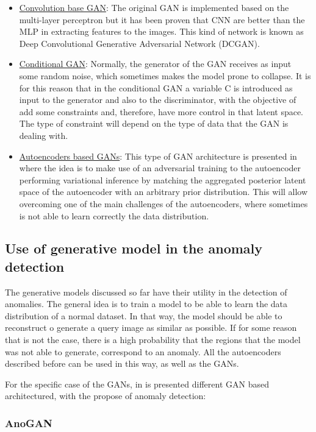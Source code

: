 \begin{itemize}
 \item \underline{Convolution base GAN}: The original GAN is implemented based on the multi-layer perceptron but it has been proven that CNN are better than the MLP in extracting features to the images. This kind of network is known as Deep Convolutional Generative Adversarial Network (DCGAN).
 \item \underline{Conditional GAN}: Normally, the generator of the GAN receives as input some random noise, which sometimes makes the model prone to collapse. It is for this reason that in the conditional GAN a variable C is introduced as input to the generator and also to the discriminator, with the objective of add some constraints and, therefore, have more control in that latent space. The type of constraint will depend on the type of data that the GAN is dealing with.
 \item \underline{Autoencoders based GANs}: This type of GAN architecture is presented in \cite{Makhzani2015} where the idea is to make use of an adversarial training to the autoencoder performing variational inference by matching the aggregated posterior latent space of the autoencoder with an arbitrary prior distribution. This will allow overcoming one of the main challenges of the autoencoders, where sometimes is not able to learn correctly the data distribution.
\end{itemize}

\subsection{Use of generative model in the anomaly detection}

The generative models discussed so far have their utility in the detection of anomalies. The general idea is to train a model to be able to learn the data distribution of a normal dataset. In that way, the model should be able to reconstruct o generate a query image as similar as possible. If for some reason that is not the case, there is a high probability that the regions that the model was not able to generate, correspond to an anomaly. All the autoencoders described before can be used in this way, as well as the GANs.

For the specific case of the GANs, in \cite{DiMattia2019} is presented different GAN based architectured, with the propose of anomaly detection:

\subsubsection{AnoGAN}

